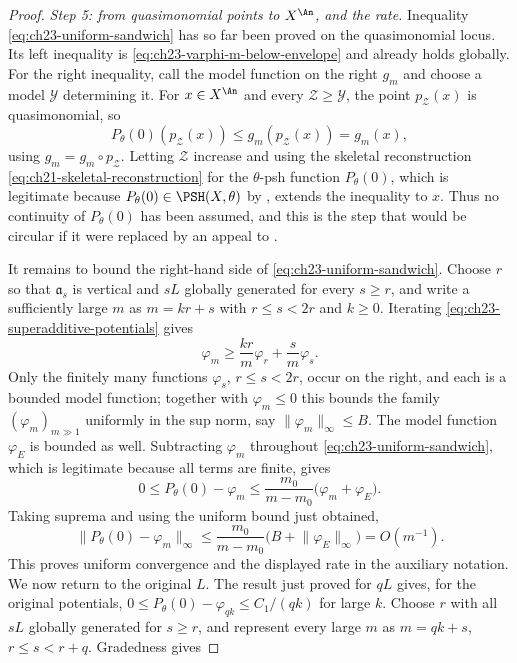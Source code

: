 \begin{proof}
\emph{Step 5: from quasimonomial points to $X^{\An}$, and the rate.}
Inequality \eqref{eq:ch23-uniform-sandwich} has so far been proved on the
quasimonomial locus.  Its left inequality is
\eqref{eq:ch23-varphi-m-below-envelope} and already holds globally.  For the
right inequality, call the model function on the right $g_m$ and choose a
model $\mathcal Y$ determining it.  For $x\in X^{\An}$ and every
$\mathcal Z\geq\mathcal Y$, the point $p_{\mathcal Z}(x)$ is
quasimonomial, so
\[
       P_\theta(0)(p_{\mathcal Z}(x))
       \leq g_m(p_{\mathcal Z}(x))=g_m(x),
\]
using $g_m=g_m\circ p_{\mathcal Z}$.  Letting $\mathcal Z$ increase and
using the skeletal reconstruction
\eqref{eq:ch21-skeletal-reconstruction} for the $\theta$-psh function
$P_\theta(0)$, which is legitimate because $P_\theta(0)\in\PSH(X,\theta)$
by , extends the inequality to $x$.
Thus no continuity of $P_\theta(0)$ has been assumed, and this is the
step that would be circular if it were replaced by an appeal to
.

It remains to bound the right-hand side of
\eqref{eq:ch23-uniform-sandwich}.  Choose $r$ so that $\mathfrak a_s$ is
vertical and $sL$ globally generated for every $s\geq r$, and write a
sufficiently large $m$ as $m=kr+s$ with $r\leq s<2r$ and
$k\geq0$.  Iterating \eqref{eq:ch23-superadditive-potentials} gives
\[
 \varphi_m
 \geq\frac{kr}{m}\varphi_r+\frac{s}{m}\varphi_s .
\]
Only the finitely many functions $\varphi_s$, $r\leq s<2r$, occur on the
right, and each is a bounded model function; together with
$\varphi_m\leq0$ this bounds the family $(\varphi_m)_{m\gg1}$ uniformly
in the sup norm, say $\|\varphi_m\|_\infty\leq B$.  The model function
$\varphi_E$ is bounded as well.  Subtracting $\varphi_m$ throughout
\eqref{eq:ch23-uniform-sandwich}, which is legitimate because all terms are
finite, gives
\begin{equation}\label{eq:ch23-sandwich-difference}
 0\leq P_\theta(0)-\varphi_m
 \leq\frac{m_0}{m-m_0}
          \bigl(\varphi_m+\varphi_E\bigr) .
\end{equation}
Taking suprema and using the uniform bound just obtained,
\begin{equation}\label{eq:ch23-envelope-rate}
 \lVert P_\theta(0)-\varphi_m\rVert_\infty
 \leq \frac{m_0}{m-m_0}
 \bigl(B+\lVert\varphi_E\rVert_\infty\bigr)
 =O(m^{-1}).
\end{equation}
This proves uniform convergence and the displayed rate in the auxiliary
notation.  We now return to the original $L$.  The result just proved for
$qL$ gives, for the original potentials,
$0\leq P_\theta(0)-\varphi_{qk}\leq C_1/(qk)$ for large $k$.
Choose $r$ with all $sL$ globally generated for $s\geq r$, and represent
every large $m$ as $m=qk+s$, $r\leq s<r+q$.  Gradedness gives


\end{proof}
